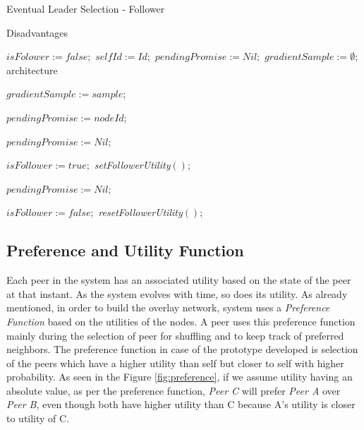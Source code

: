 \documentclass[12pt,a4paper,twoside,openright]{book}
\begin{document}
\begin{algorithm}[h]
\caption{Eventual Leader Selection - Follower} 
\label{follower}Disadvantages
\begin{algorithmic}[1]

  \State $isFolower := false;$
  \State $selfId := Id;$ $pendingPromise := Nil;$
  \State $gradientSample := \emptyset;$architecture
\EndUponS

  \State $gradientSample := sample;$
 \EndUpon

    \State $pendingPromise := nodeId;$
    \EndTrigger
    \TriggerS[promiseTimeout]{}\EndTriggerS
  \Else
     \EndTrigger
  \EndIf
\EndUpon

\UponS[promiseTimeout]{}
  \State $pendingPromise := Nil;$
\EndUponS

    \TriggerS[followerLeaseTimeout]{}\EndTriggerS
    \TriggerS[cancelPromiseTimeout]{}\EndTriggerS
    \State $isFollower := true;$
    \State \emph{setFollowerUtility}$();$
  \EndIf
\EndUpon

\UponS[promiseTimeout]{}
  \State $pendingPromise := Nil;$
\EndUponS

\UponS[leaseTimeout]{} 
  \State $isFollower := false;$
  \State \emph{resetFollowerUtility}$();$
\EndUponS

\end{algorithmic}
\end{algorithm}







\subsection{Preference and Utility Function}
\label{ssec:utility}
Each peer in the system has an associated utility based on the state of the peer at that instant. As the system evolves with time, so does its utility. As already mentioned, in order to build the overlay network, system uses a \textit {Preference Function} based on the utilities of the nodes. A peer uses this preference function mainly during the selection of peer for shuffling and to keep track of preferred neighbors. The preference function in case of the prototype developed is selection of the peers which have a higher utility than self but closer to self with higher probability. As seen in the Figure \ref{fig:preference}, if we assume utility having an absolute value, as per the preference function, \textit{Peer C} will prefer \textit{Peer A} over \textit{Peer B}, even though both have higher utility than C because A's utility is closer to utility of C.
\end{document}
